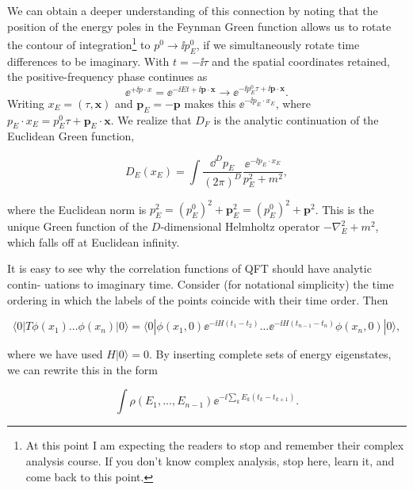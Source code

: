 We can obtain a deeper understanding of this connection by noting that the position
of the energy poles in the Feynman Green function allows us to rotate the contour of
integration\footnote[4]{At this point I am expecting the readers to stop and remember their complex analysis course. If you don't know complex analysis, stop here, learn it, and come back to this point.} to $p^0\to\ii p_E^0$, if we simultaneously rotate time differences to be imaginary. With
$t=-\ii\tau$ and the spatial coordinates retained, the positive-frequency phase continues as
\begin{equation*}
 \ee^{+\ii p\mathbin{\cdot}x}=\ee^{-\ii Et+\ii\mathbf p\mathbin{\cdot}\mathbf x}
 \longrightarrow \ee^{-\ii p_E^0\tau+\ii\mathbf p\mathbin{\cdot}\mathbf x}.
\end{equation*}
Writing $x_E=(\tau,\mathbf x)$ and $\mathbf p_E=-\mathbf p$ makes this
$\ee^{-\ii p_E\mathbin{\cdot}x_E}$, where
$p_E\mathbin{\cdot}x_E=p_E^0\tau+\mathbf p_E\mathbin{\cdot}\mathbf x$.
We realize that $D_F$ is the analytic continuation of the Euclidean Green function,

\begin{equation}
D_E(x_E)=\int\frac{\dd^D p_E}{(2\pi)^D}\frac{\ee^{-\ii p_E\mathbin{\cdot}x_E}}{p_E^2+m^2},
\label{eq:3.21}
\end{equation}

where the Euclidean norm is $p_E^2=(p_E^0)^2+\mathbf p_E^2=(p_E^0)^2+\mathbf p^2$. This is the unique Green function
of the $D$-dimensional Helmholtz operator $-\nabla_E^2+m^2$, which falls off at Euclidean
infinity.

It is easy to see why the correlation functions of QFT should have analytic contin-
uations to imaginary time. Consider (for notational simplicity) the time ordering in
which the labels of the points coincide with their time order. Then

\begin{equation}
\langle0|T\phi(x_1)\ldots\phi(x_n)|0\rangle
=\langle0|\phi(x_1,0)\ee^{-\ii H(t_1-t_2)}\ldots\ee^{-\ii H(t_{n-1}-t_n)}\phi(x_n,0)|0\rangle,
\label{eq:3.22}
\end{equation}

where we have used $H|0\rangle=0$. By inserting complete sets of energy eigenstates, we can
rewrite this in the form

\begin{equation}
\int\rho(E_1,\ldots,E_{n-1})\ee^{-\ii\sum_kE_k(t_k-t_{k+1})}.
\label{eq:3.23}
\end{equation}

